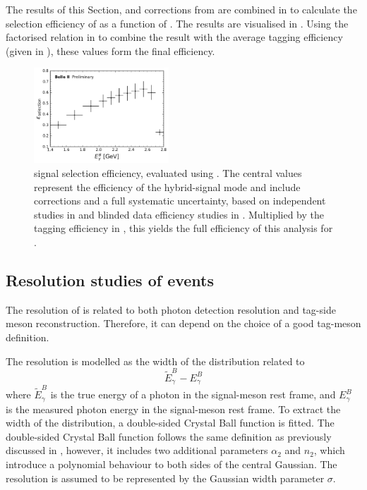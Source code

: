 The results of this Section,  and corrections from 
are combined in  to calculate the selection efficiency of \BtoXsgamma as a function of \EB.
The results are visualised in .
Using the factorised relation in  to combine the result with the average \FEI tagging efficiency (given in ), these values form the final
efficiency.

\begin{figure}[hbtp!]  
    \centering
    \includegraphics[width=0.45\textwidth]{figures/signal_validation/corrected_selection_efficiency.pdf}
    \caption{\label{fig:corrected_signal_efficiency} \BtoXsgamma signal selection efficiency, evaluated using .
    The central values represent the efficiency of the hybrid-signal mode and include corrections and a full systematic uncertainty,
    based on independent studies in  and blinded data efficiency studies in .
    Multiplied by the \FEI tagging efficiency in , this yields the full efficiency of this analysis for \BtoXsgamma.
    }
\end{figure}

\subsection{Resolution studies of \texorpdfstring{\BtoXsgamma}{B->Xs gamma} events}\label{sec:resolution_studies}

The resolution of \EB is related to both photon detection resolution and tag-side \B meson reconstruction.
Therefore, it can depend on the choice of a good tag-\B meson definition.

The resolution is modelled as the width of the distribution related to
\begin{equation}\label{eq:resolution}
    \tilde{E}_{\gamma}^{B} - E_{\gamma}^{B}
\end{equation}
where $\tilde{E}_{\gamma}^{B}$ is the true energy of a photon in the signal-\B meson rest frame,
and $E_{\gamma}^{B}$ is the measured photon energy in the signal-\B meson rest frame.
To extract the width of the distribution, a double-sided Crystal Ball function is fitted.
The double-sided Crystal Ball function follows the same definition as previously discussed in ,
however, it includes two additional parameters $\alpha_2$ and $n_2$, which introduce a polynomial behaviour to both sides of the central Gaussian.
The resolution is assumed to be represented by the Gaussian width parameter $\sigma$.

